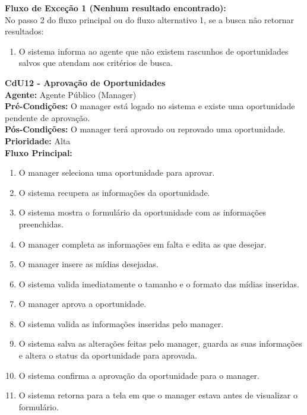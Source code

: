 \noindent\textbf{Fluxo de Exceção 1 (Nenhum resultado encontrado):}\\
No passo 2 do fluxo principal ou do fluxo alternativo 1, se a busca não retornar resultados:
\begin{enumerate}[noitemsep, topsep=-5pt, parsep=0pt]
    \item O sistema informa ao agente que não existem rascunhos de oportunidades salvos que atendam aos critérios de busca.
\end{enumerate}


\vspace{7pt}
\noindent\textbf{\normalsize CdU12 - Aprovação de Oportunidades}\\
\noindent\textbf{Agente:} Agente Público (Manager)\\ 
\textbf{Pré-Condições:} O manager está logado no sistema e existe uma oportunidade pendente de aprovação.\\ 
\textbf{Pós-Condições:} O manager terá aprovado ou reprovado uma oportunidade.\\
\textbf{Prioridade:} Alta \vspace{3pt}\\
\noindent\textbf{Fluxo Principal:}
\begin{enumerate}[noitemsep, topsep=-5pt, parsep=0pt]
    \item O manager seleciona uma oportunidade para aprovar.
    \item O sistema recupera as informações da oportunidade.
    \item O sistema mostra o formulário da oportunidade com as informações preenchidas.
    \item O manager completa as informações em falta e edita as que desejar.
    \item O manager insere as mídias desejadas.
    \item O sistema valida imediatamente o tamanho e o formato das mídias inseridas.
    \item O manager aprova a oportunidade.
    \item O sistema valida as informações inseridas pelo manager.
    \item O sistema salva as alterações feitas pelo manager, guarda as suas informações e altera o status da oportunidade para aprovada.
    \item O sistema confirma a aprovação da oportunidade para o manager.
    \item O sistema retorna para a tela em que o manager estava antes de visualizar o formulário.
\end{enumerate}

